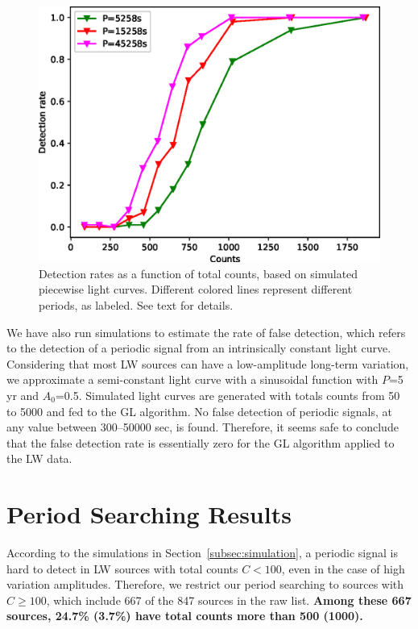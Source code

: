 \documentclass[fleqn,usenatbib]{mnras}
\begin{document}
\begin{figure}
\centering
\includegraphics[scale=0.61]{./figure/sim_LW/eclipse_cut.eps}
\caption{Detection rates as a function of total counts, based on simulated piecewise light curves. Different colored lines represent different periods, as labeled. See text for details.}\label{fig:eclipse}
\end{figure}

We have also run simulations to estimate the rate of false detection, which refers to the detection of a periodic signal from an intrinsically constant light curve. 
Considering that most LW sources can have a low-amplitude long-term variation, we approximate a semi-constant light curve with a sinusoidal function with $P$=5 yr and $A_0$=0.5. 
Simulated light curves are generated with totals counts from 50 to 5000 and fed to the GL algorithm. No false detection of periodic signals, at any value between 300--50000 sec, is found. 
Therefore, it seems safe to conclude that the false detection rate is essentially zero for the GL algorithm applied to the LW data. 

\section{Period Searching Results}\label{sec:results}
According to the simulations in Section~\ref{subsec:simulation}, a periodic signal is hard to detect in LW sources with total counts $C<100$, even in the case of high variation amplitudes.  
Therefore, we restrict our period searching to sources with $C \geq 100$, which include 667 of the 847 sources in the raw list. {\bf Among these 667 sources, 24.7\% (3.7\%) have total counts more than 500 (1000).}
\end{document}
